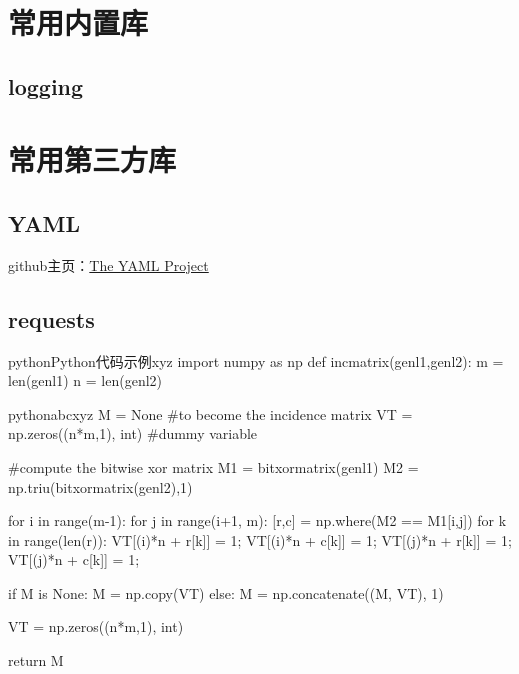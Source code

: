 \section{常用内置库}
\subsection{logging}


\section{常用第三方库}
\subsection{YAML}
github主页：\href{https://github.com/yaml}{The YAML Project}

\subsection{requests}

\begin{jcode}{python}{Python代码示例}{xyz}
import numpy as np
def incmatrix(genl1,genl2):
    m = len(genl1)
    n = len(genl2)
\end{jcode}
\begin{jcode}{python}{abc}{xyz}
    M = None #to become the incidence matrix
    VT = np.zeros((n*m,1), int)  #dummy variable

    #compute the bitwise xor matrix
    M1 = bitxormatrix(genl1)
    M2 = np.triu(bitxormatrix(genl2),1)

    for i in range(m-1):
        for j in range(i+1, m):
            [r,c] = np.where(M2 == M1[i,j])
            for k in range(len(r)):
                VT[(i)*n + r[k]] = 1;
                VT[(i)*n + c[k]] = 1;
                VT[(j)*n + r[k]] = 1;
                VT[(j)*n + c[k]] = 1;

                if M is None:
                    M = np.copy(VT)
                else:
                    M = np.concatenate((M, VT), 1)

                VT = np.zeros((n*m,1), int)

    return M
\end{jcode}


